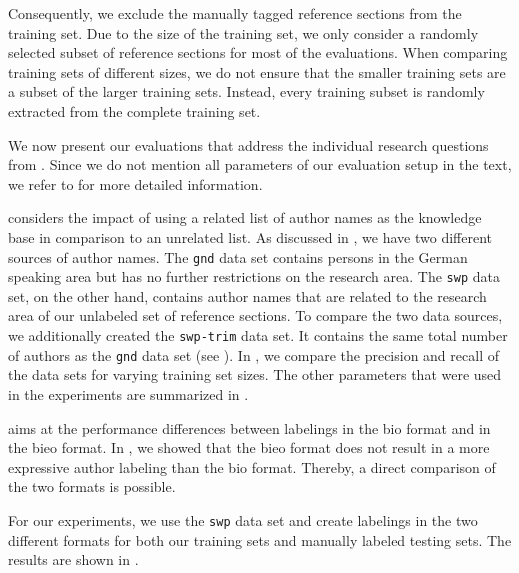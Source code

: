 %
Consequently, we exclude the manually tagged reference sections from the training set.
Due to the size of the training set, we only consider a randomly selected subset of reference sections for most of the evaluations.
When comparing training sets of different sizes, we do not ensure that the smaller training sets are a subset of the larger training sets.
Instead, every training subset is randomly extracted from the complete training set.

We now present our evaluations that address the individual research questions from .
Since we do not mention all parameters of our evaluation setup in the text, we refer to  for more detailed information.

\bigskip

 considers the impact of using a related list of author names as the knowledge base in comparison to an unrelated list.
As discussed in , we have two different sources of author names.
The \texttt{gnd} data set contains persons in the German speaking area but has no further restrictions on the research area.
The \texttt{swp} data set, on the other hand, contains author names that are related to the research area of our unlabeled set of reference sections.
To compare the two data sources, we additionally created the \texttt{swp-trim} data set.
It contains the same total number of authors as the \texttt{gnd} data set (see ).
In , we compare the precision and recall of the data sets for varying training set sizes.
The other parameters that were used in the experiments are summarized in .

\bigskip

 aims at the performance differences between labelings in the \gls{bio} format and in the \gls{bieo} format.
In , we showed that the \gls{bieo} format does not result in a more expressive author labeling than the \gls{bio} format.
Thereby, a direct comparison of the two formats is possible.

For our experiments, we use the \texttt{swp} data set and create labelings in the two different formats for both our training sets and manually labeled testing sets.
The results are shown in .

\bigskip

